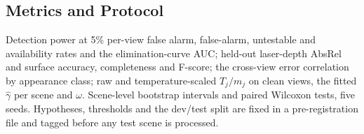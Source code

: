 \subsection{Metrics and Protocol}
Detection power at 5\% per-view false alarm, false-alarm, untestable and availability rates and the
elimination-curve AUC; held-out laser-depth AbsRel and surface accuracy, completeness and F-score; the
cross-view error correlation by appearance class; raw and temperature-scaled $T_j/m_j$ on clean views, the fitted $\hat\gamma$ per scene and $\omega$.
Scene-level bootstrap intervals and paired Wilcoxon tests, five seeds. Hypotheses, thresholds and the
dev/test split are fixed in a pre-registration file and tagged before any test scene is processed.
